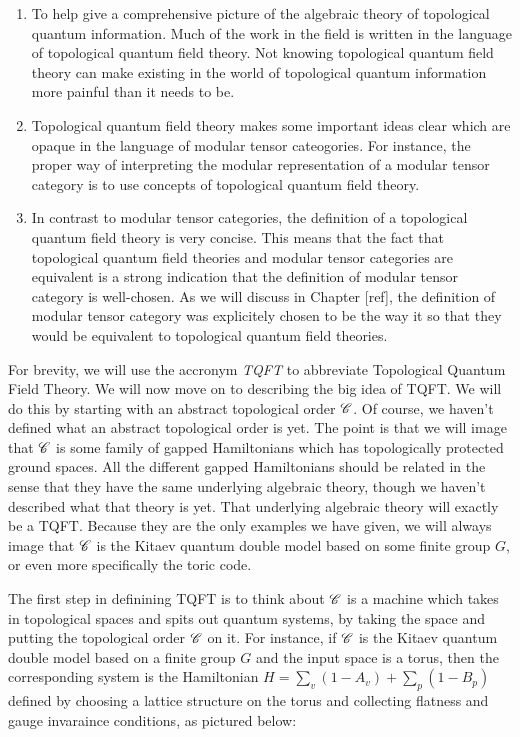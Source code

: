 \begin{enumerate}
\item To help give a comprehensive picture of the algebraic theory of topological quantum information. Much of the work in the field is written in the language of topological quantum field theory. Not knowing topological quantum field theory can make existing in the world of topological quantum information more painful than it needs to be.

\item Topological quantum field theory makes some important ideas clear which are opaque in the language of modular tensor cateogories. For instance, the proper way of interpreting the modular representation of a modular tensor category is to use concepts of topological quantum field theory.

\item In contrast to modular tensor categories, the definition of a topological quantum field theory is very concise. This means that the fact that topological quantum field theories and modular tensor categories are equivalent is a strong indication that the definition of modular tensor category is well-chosen. As we will discuss in Chapter [ref], the definition of modular tensor category was explicitely chosen to be the way it so that they would be equivalent to topological quantum field theories.
\end{enumerate}

For brevity, we will use the accronym \textit{TQFT} to abbreviate Topological Quantum Field Theory. We will now move on to describing the big idea of TQFT. We will do this by starting with an abstract topological order $\mathscr{C}$. Of course, we haven't defined what an abstract topological order is yet. The point is that we will image that $\mathscr{C}$ is some family of gapped Hamiltonians which has topologically protected ground spaces. All the different gapped Hamiltonians should be related in the sense that they have the same underlying algebraic theory, though we haven't described what that theory is yet. That underlying algebraic theory will exactly be a TQFT. Because they are the only examples we have given, we will always image that $\mathscr{C}$ is the Kitaev quantum double model based on some finite group $G$, or even more specifically the toric code.

The first step in definining TQFT is to think about $\mathscr{C}$ is a machine which takes in topological spaces and spits out quantum systems, by taking the space and putting the topological order $\mathscr{C}$ on it. For instance, if $\mathscr{C}$ is the Kitaev quantum double model based on a finite group $G$ and the input space is a torus, then the corresponding system is the Hamiltonian $H=\sum_{v}(1-A_v)+\sum_{p}(1-B_p)$ defined by choosing a lattice structure on the torus and collecting flatness and gauge invaraince conditions, as pictured below:

